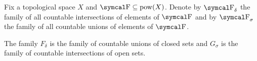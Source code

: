 \begin{definition}\label{def:borel_algebra}
  Fix a topological space \( X \) and \( \CF \subseteq \Pow(X) \). Denote by \( \CF_\delta \) the family of all countable intersections of elements of \( \CF \) and by \( \CF_\sigma \) the family of all countable unions of elements of \( \CF \).

  The family \( F_\delta \) is the family of countable unions of closed sets and \( G_\sigma \) is the family of countable intersections of open sets.
\end{definition}
